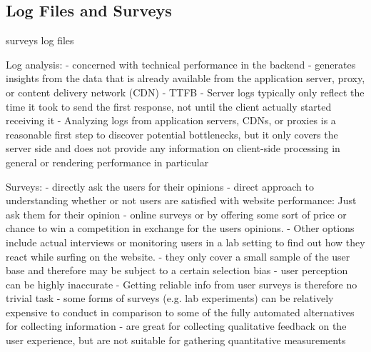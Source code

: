 









\subsection{Log Files and Surveys}

surveys
log files




Log analysis:
- concerned with technical performance in the backend
- generates insights from the data that is already available from the application server, proxy, or content delivery network (CDN)
- TTFB
- Server logs typically only reflect the time it took to send the first response, not until the client actually started receiving it
- Analyzing logs from application servers, CDNs, or proxies is a reasonable first step to discover potential bottlenecks, but it only covers the server side and does not provide any information on client-side processing in general or rendering performance in particular


Surveys:
- directly ask the users for their opinions
- direct approach to understanding whether or not users are satisfied with website performance: Just ask them for their opinion
- online surveys or by offering some sort of price or chance to win a competition in exchange for the users opinions. 
- Other options include actual interviews or monitoring users in a lab setting to find out how they react while surfing on the website.
- they only cover a small sample of the user base and therefore may be subject to a certain selection bias
- user perception can be highly inaccurate
- Getting reliable info from user surveys is therefore no trivial task
- some forms of surveys (e.g. lab experiments) can be relatively expensive to conduct in comparison to some of the fully automated alternatives for collecting information
- are great for collecting qualitative feedback on the user experience, but are not suitable for gathering quantitative measurements



